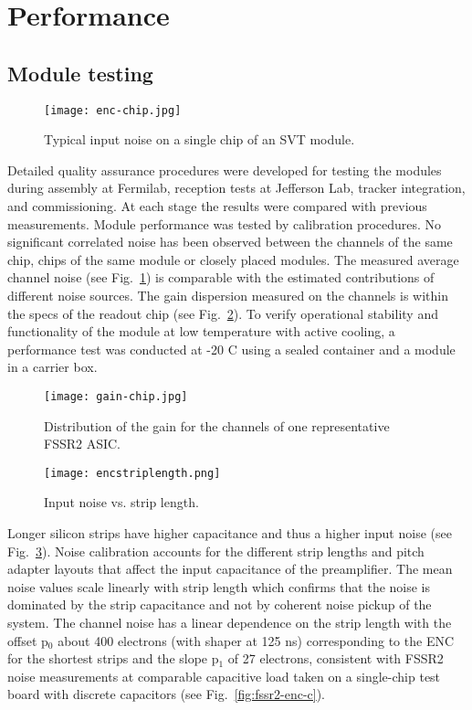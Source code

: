 \section{Performance}

\subsection{Module testing}

\begin{figure}[hbt] 
\centering 
\texttt{[image: enc-chip.jpg]}
\caption{Typical input noise on a single chip of an SVT module.}
\label{fig:enc-chip}
\end{figure} 

Detailed quality assurance procedures were developed for testing the modules during assembly at Fermilab, reception tests at Jefferson Lab, tracker integration, and commissioning. At each stage the results were compared with previous measurements. Module performance was tested by calibration procedures. No significant correlated noise has been observed between the channels of the same chip, chips of the same module or closely placed modules. The measured average channel noise (see Fig.~\ref{fig:enc-chip}) is comparable with the estimated contributions of different noise sources. The gain dispersion measured on the channels is within the specs of the readout chip (see Fig.~\ref{fig:gain-chip}). To verify operational stability and functionality of the module at low temperature with active cooling, a performance test was conducted at -20 C using a sealed container and a module in a carrier box.

\begin{figure}[hbt] 
\centering 
\texttt{[image: gain-chip.jpg]}
\caption{Distribution of the gain for the channels of one representative FSSR2 ASIC.}
\label{fig:gain-chip}
\end{figure}

\begin{figure}[hbt] 
	\centering 
	\texttt{[image: encstriplength.png]}
	\caption{Input noise vs. strip length.}
	\label{fig:encstriplength}
\end{figure}

Longer silicon strips have higher capacitance and thus a higher input noise (see Fig.~\ref{fig:encstriplength}). Noise calibration accounts for the different strip lengths and pitch adapter layouts that affect the input capacitance of the preamplifier. The mean noise values scale linearly with strip length which confirms that the noise is dominated by the strip capacitance and not by coherent noise pickup of the system. The channel noise has a linear dependence on the strip length with the offset p$_{0}$ about 400 electrons (with shaper at 125 ns) corresponding to the ENC for the shortest strips and the slope p$_1$ of 27 electrons, consistent with FSSR2 noise measurements at comparable capacitive load taken on a single-chip test board with discrete capacitors (see Fig.~\ref{fig:fssr2-enc-c}).

